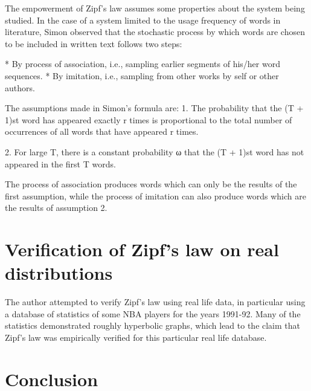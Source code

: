 \documentclass{article}
\begin{document}
The empowerment of Zipf's law assumes some properties about the
system being studied. In the case of a system limited to the usage
frequency of words in literature, Simon observed that the stochastic
process by which words are chosen to be included in written text
follows two steps:

* By process of association, i.e., sampling earlier segments of
his/her word sequences.
* By imitation, i.e., sampling from other works by self or other authors.

The assumptions made in Simon's formula are:
1. The probability that the (T + 1)st word has appeared exactly r
times is proportional to the total number of occurrences of all words
that have appeared r times.

2. For large T, there is a constant probability ω that the (T + 1)st
word has not appeared in the first T words. 

The process of association produces words which can only be the
results of the first assumption, while the process of imitation can
also produce words which are the results of assumption 2.

\section{Verification of Zipf's law on real distributions}

The author attempted to verify Zipf's law using real life data, in
particular using a database of statistics of some NBA players for the
years 1991-92. Many of the statistics demonstrated roughly hyperbolic
graphs, which lead to the claim that Zipf's law was empirically
verified for this particular real life database.

\section{Conclusion}
\end{document}

